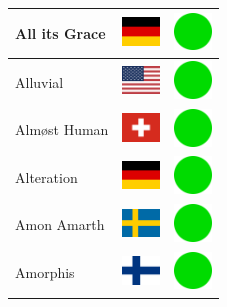 \documentclass[12pt, a4paper, twoside]{report}
\begin{document}
\begin{center}
\begin{longtable}{|p{5cm}|p{2cm}|p{2cm}|}
All its Grace & \includegraphics[width=1cm]{4x3/de} & \includegraphics[width=1cm]{likes/y} \\ \hline
Alluvial & \includegraphics[width=1cm]{4x3/us} & \includegraphics[width=1cm]{likes/y} \\ \hline
Almøst Human & \includegraphics[width=1cm]{4x3/ch} & \includegraphics[width=1cm]{likes/y} \\ \hline
Alteration & \includegraphics[width=1cm]{4x3/de} & \includegraphics[width=1cm]{likes/y} \\ \hline
Amon Amarth & \includegraphics[width=1cm]{4x3/se} & \includegraphics[width=1cm]{likes/y} \\ \hline
Amorphis & \includegraphics[width=1cm]{4x3/fi} & \includegraphics[width=1cm]{likes/y} \\ \hline

\end{longtable}
\end{center}
\end{document}
